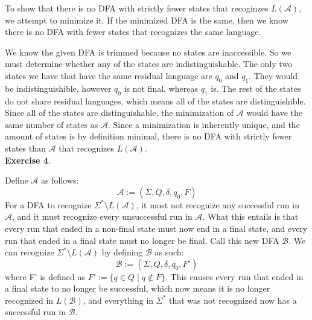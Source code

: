\documentclass{article}
\begin{document}
\begin{center}
\end{center}


To show that there is no DFA with strictly fewer states that recoginzes $L(\mathcal{A})$, we attempt to minimize it. If the minimized DFA is the same, then we know there is no DFA with fewer states that recognizes the same language.

We know the given DFA is trimmed because no states are inaccessible. So we must determine whether any of the states are indistinguishable. The only two states we have that have the same residual language are $q_0$ and $q_1$. They would be indistinguishible, however $q_0$ is not final, whereas $q_1$ is. The rest of the states do not share residual languages, which means all of the states are distinguishible. Since all of the states are distinguishable, the minimization of $\mathcal{A}$ would have the same number of states as $\mathcal{A}$. Since a minimization is inherently unique, and the amount of states is by definition minimal, there is no DFA with strictly fewer states than $\mathcal{A}$ that recognizes $L(\mathcal{A})$.\\

\textbf{Exercise 4}.
 
Define $\mathcal{A}$ as follows: \[\mathcal{A} := (\Sigma, Q, \delta, q_0, F)\]For a DFA to recognize $\Sigma^* \setminus L(\mathcal{A})$, it must not recognize any successful run in $\mathcal{A}$, and it must recognize every unsuccessful run in $\mathcal{A}$. What this entails is that every run that ended in a non-final state must now end in a final state, and every run that ended in a final state must no longer be final. Call this new DFA $\mathcal{B}$. We can recognize $\Sigma^* \setminus L(\mathcal{A})$ by defining $\mathcal{B}$ as such: \[\mathcal{B} := (\Sigma, Q, \delta, q_0, F')\] where F' is defined as $F' := \{q \in Q \mid q \not \in F\}$. This causes every run that ended in a final state to no longer be successful, which now means it is no longer recognized in $L(\mathcal{B})$, and everything in $\Sigma^*$ that was not recognized now has a successful run in $\mathcal{B}$.\\
\end{document}
